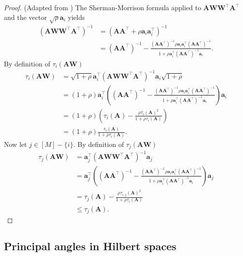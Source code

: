 \documentclass[twoside,11pt]{book}
\numberwithin{theorem}{chapter}
\numberwithin{definition}{chapter}
\numberwithin{proposition}{chapter}
\numberwithin{corollary}{chapter}
\numberwithin{example}{chapter}
\numberwithin{lemma}{chapter}
\numberwithin{assumption}{chapter}
\DeclareMathOperator{\Tran}{\intercal}
\begin{document}
\begin{proof}(Adapted from \cite{Coh15})
The Sherman-Morrison formula applied to $\bm{A}\bm{W}\bm{W}^{\Tran}\bm{A}^{\Tran}$ and the vector $\sqrt{\rho} \bm{a}_{i}$ yields
\begin{align}
(\bm{A}\bm{W}\bm{W}^{\Tran}\bm{A}^{\Tran})^{-1} &  = (\bm{A}\bm{A}^{\Tran} + \rho \bm{a}_{i}\bm{a}_{i}^{\Tran})^{-1} \\
& = (\bm{A}\bm{A}^{\Tran})^{-1} - \frac{(\bm{A}\bm{A}^{\Tran})^{-1}\rho \bm{a}_{i}\bm{a}_{i}^{\Tran} (\bm{A}\bm{A}^{\Tran})^{-1}}{1+ \rho \bm{a}_{i}^{\Tran}(\bm{A}\bm{A}^{\Tran})^{-1}\bm{a}_{i}}.
\end{align}
By definition of $\tau_{i}(\bm{A}\bm{W})$
\begin{align}
\tau_{i}(\bm{A}\bm{W}) & = \sqrt{1 + \rho} \bm{a}_{i}^{\Tran}(\bm{A}\bm{W}\bm{W}^{\Tran}\bm{A}^{\Tran})^{-1}\bm{a}_{i}\sqrt{1 + \rho}\\
& = (1+\rho)\bm{a}_{i}^{\Tran} \left( (\bm{A}\bm{A}^{\Tran})^{-1} - \frac{(\bm{A}\bm{A}^{\Tran})^{-1}\rho \bm{a}_{i}\bm{a}_{i}^{\Tran} (\bm{A}\bm{A}^{\Tran})^{-1}}{1+ \rho \bm{a}_{i}^{\Tran}(\bm{A}\bm{A}^{\Tran})^{-1}\bm{a}_{i}} \right) \bm{a}_{i} \nonumber\\
& = (1+\rho) \left(\tau_{i}(\bm{A}) - \frac{\rho \tau_{i}(\bm{A})^{2}}{1+\rho \tau_{i}(\bm{A})} \right) \nonumber\\
& = (1+\rho)\frac{\tau_{i}(\bm{A})}{1+\rho \tau_{i}(\bm{A})} \nonumber.
\end{align}
Now let $j \in [M]-\{i\}$. By definition of $\tau_{j}(\bm{A}\bm{W})$
\begin{align}
\tau_{j}(\bm{A}\bm{W}) & =  \bm{a}_{j}^{\Tran}(\bm{A}\bm{W}\bm{W}^{\Tran}\bm{A}^{\Tran})^{-1}\bm{a}_{j}\\
& = \bm{a}_{j}^{\Tran} \left( (\bm{A}\bm{A}^{\Tran})^{-1} - \frac{(\bm{A}\bm{A}^{\Tran})^{-1}\rho \bm{a}_{i}\bm{a}_{i}^{\Tran} (\bm{A}\bm{A}^{\Tran})^{-1}}{1+ \rho \bm{a}_{i}^{\Tran}(\bm{A}\bm{A}^{\Tran})^{-1}\bm{a}_{i}} \right) \bm{a}_{j} \nonumber\\
& =  \tau_{j}(\bm{A}) - \frac{\rho \tau_{i,j}(\bm{A})^{2}}{1+\rho \tau_{i}(\bm{A})} \nonumber\\
& \leq \tau_{j}(\bm{A}) \nonumber.
\end{align}
\end{proof}



\subsection{Principal angles in Hilbert spaces}\label{sec:proof_principal_angles}
\end{document}
